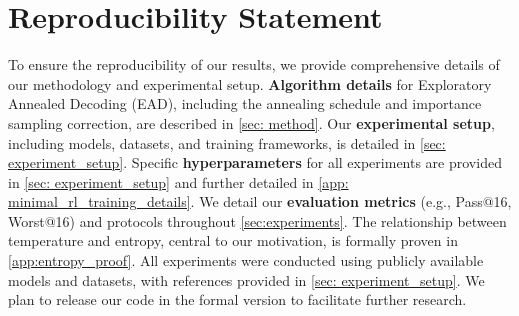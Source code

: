 \section*{Reproducibility Statement}
To ensure the reproducibility of our results, we provide comprehensive details of our methodology and experimental setup. \textbf{Algorithm details} for Exploratory Annealed Decoding (EAD), including the annealing schedule and importance sampling correction, are described in \cref{sec: method}. Our \textbf{experimental setup}, including models, datasets, and training frameworks, is detailed in \cref{sec: experiment_setup}. Specific \textbf{hyperparameters} for all experiments are provided in \cref{sec: experiment_setup} and further detailed in \cref{app: minimal_rl_training_details}. We detail our \textbf{evaluation metrics} (e.g., Pass@16, Worst@16) and protocols throughout \cref{sec:experiments}. The relationship between temperature and entropy, central to our motivation, is formally proven in \cref{app:entropy_proof}. All experiments were conducted using publicly available models and datasets, with references provided in \cref{sec: experiment_setup}. We plan to release our code in the formal version to facilitate further research.